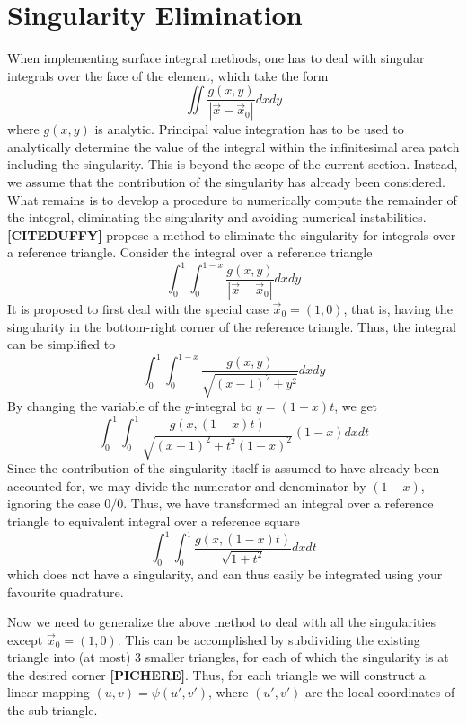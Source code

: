 \section{Singularity Elimination}

When implementing surface integral methods, one has to deal with singular integrals over the face of the element, which take the form
\[ \iint \frac{g(x,y)}{|\vec{x} - \vec{x}_0|} dx dy \]
where $g(x,y)$ is analytic. Principal value integration has to be used to analytically determine the value of the integral within the infinitesimal area patch including the singularity.
This is beyond the scope of the current section. Instead, we assume that the contribution of the singularity has already been considered. What remains is to develop a procedure to
numerically compute the remainder of the integral, eliminating the singularity and avoiding numerical instabilities. \\

\noindent
\textbf{[CITEDUFFY]} propose a method to eliminate the singularity for integrals over a reference triangle. Consider the integral over a reference triangle
\[ \int_0^1 \int_0^{1-x} \frac{g(x,y)}{|\vec{x} - \vec{x}_0|} dx dy \]
It is proposed to first deal with the special case $\vec{x}_0 = (1,0)$, that is, having the singularity in the bottom-right corner of the reference triangle.
Thus, the integral can be simplified to
\[ \int_0^1 \int_0^{1-x} \frac{g(x,y)}{\sqrt{(x-1)^2 + y^2}} dx dy \]
By changing the variable of the $y$-integral to $y=(1-x)t$, we get
\[ \int_0^1 \int_0^1 \frac{g(x,(1-x)t)}{\sqrt{(x-1)^2 + t^2(1-x)^2}} (1-x)dx dt \]
Since the contribution of the singularity itself is assumed to have already been accounted for, we may divide the numerator and denominator by $(1-x)$, ignoring the case $0/0$.
Thus, we have transformed an integral over a reference triangle to equivalent integral over a reference square
\[ \int_0^1 \int_0^1 \frac{g(x,(1-x)t)}{\sqrt{1 + t^2}} dx dt \]
which does not have a singularity, and can thus easily be integrated using your favourite quadrature.

\noindent
Now we need to generalize the above method to deal with all the singularities except $\vec{x}_0 = (1,0)$. This can be accomplished by subdividing the existing triangle
into (at most) 3 smaller triangles, for each of which the singularity is at the desired corner \textbf{[PICHERE]}. Thus, for each triangle we will construct a linear
mapping $(u,v) = \psi(u', v')$, where $(u', v')$ are the local coordinates of the sub-triangle. \\

